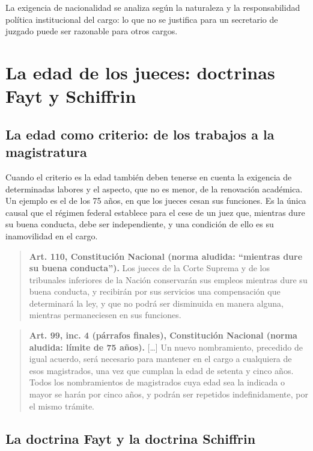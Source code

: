 \documentclass[12pt,oneside]{book}
\begin{document}
\begin{important}
La exigencia de nacionalidad se analiza según la naturaleza y la responsabilidad política institucional del cargo: lo que no se justifica para un secretario de juzgado puede ser razonable para otros cargos.
\end{important}

\section{La edad de los jueces: doctrinas Fayt y Schiffrin}

\subsection{La edad como criterio: de los trabajos a la magistratura}

Cuando el criterio es la edad también deben tenerse en cuenta la exigencia de determinadas labores y el aspecto, que no es menor, de la renovación académica. Un ejemplo es el de los 75 años, en que los jueces cesan sus funciones. Es la única causal que el régimen federal establece para el cese de un juez que, mientras dure su buena conducta, debe ser independiente, y una condición de ello es su inamovilidad en el cargo.

\begin{quote}
\textbf{Art. 110, Constitución Nacional (norma aludida: ``mientras dure su buena conducta'').} Los jueces de la Corte Suprema y de los tribunales inferiores de la Nación conservarán sus empleos mientras dure su buena conducta, y recibirán por sus servicios una compensación que determinará la ley, y que no podrá ser disminuida en manera alguna, mientras permaneciesen en sus funciones.
\end{quote}

\begin{quote}
\textbf{Art. 99, inc. 4 (párrafos finales), Constitución Nacional (norma aludida: límite de 75 años).} [\ldots] Un nuevo nombramiento, precedido de igual acuerdo, será necesario para mantener en el cargo a cualquiera de esos magistrados, una vez que cumplan la edad de setenta y cinco años. Todos los nombramientos de magistrados cuya edad sea la indicada o mayor se harán por cinco años, y podrán ser repetidos indefinidamente, por el mismo trámite.
\end{quote}

\subsection{La doctrina Fayt y la doctrina Schiffrin}
\end{document}
